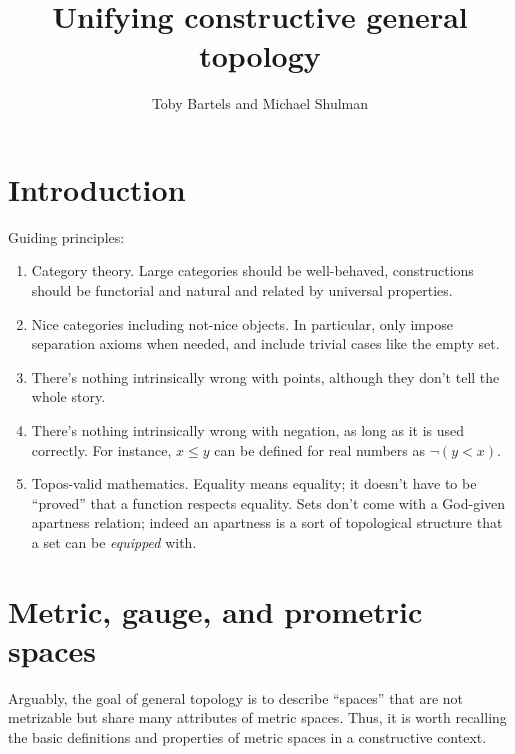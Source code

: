 \documentclass{article}
\title{Unifying constructive general topology}
\author{Toby Bartels and Michael Shulman}
\begin{document}
\maketitle

\section{Introduction}
\label{sec:intro}

Guiding principles:
\begin{enumerate}
\item Category theory.  Large categories should be well-behaved, constructions should be functorial and natural and related by universal properties.
\item Nice categories including not-nice objects.  In particular, only impose separation axioms when needed, and include trivial cases like the empty set.
\item There's nothing intrinsically wrong with points, although they don't tell the whole story.
\item There's nothing intrinsically wrong with negation, as long as it is used correctly.
  For instance, $x\le y$ can be defined for real numbers as $\neg(y<x)$.
\item Topos-valid mathematics.  Equality means equality; it doesn't have to be ``proved'' that a function respects equality.  Sets don't come with a God-given apartness relation; indeed an apartness is a sort of topological structure that a set can be \emph{equipped} with.
\end{enumerate}


\section{Metric, gauge, and prometric spaces}
\label{sec:metric}

Arguably, the goal of general topology is to describe ``spaces'' that are not metrizable but share many attributes of metric spaces.
Thus, it is worth recalling the basic definitions and properties of metric spaces in a constructive context.
\end{document}
